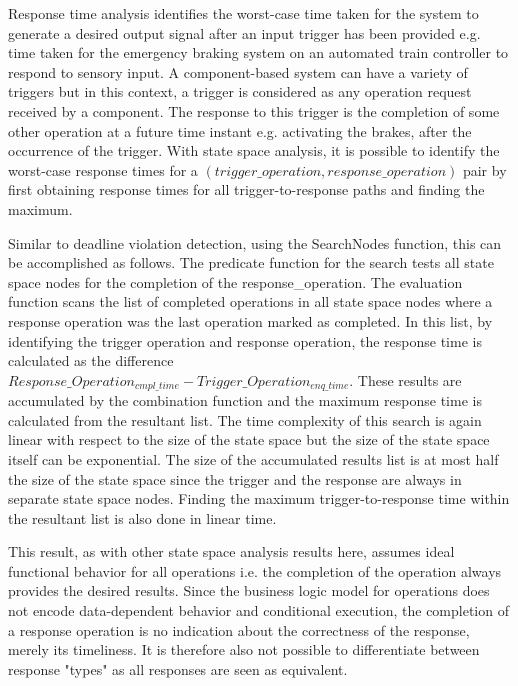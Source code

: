 Response time analysis identifies the worst-case time taken for the system to generate a desired output signal after an input trigger has been provided e.g. time taken for the emergency braking system on an automated train controller to respond to sensory input. A component-based system can have a variety of triggers but in this context, a trigger is considered as any operation request received by a component. The response to this trigger is the completion of some other operation at a future time instant e.g. activating the brakes, after the occurrence of the trigger. With state space analysis, it is possible to identify the worst-case response times for a $(trigger\_operation, response\_operation)$ pair by first obtaining response times for all trigger-to-response paths and finding the maximum. 

Similar to deadline violation detection, using the SearchNodes function, this can be accomplished as follows. The predicate function for the search tests all state space nodes for the completion of the response\_operation. The evaluation function scans the list of completed operations in all state space nodes where a response operation was the last operation marked as completed. In this list, by identifying the trigger operation and response operation, the response time is calculated as the difference $Response\_Operation_{cmpl\_time} - Trigger\_Operation_{enq\_time}$. These results are accumulated by the combination function and the maximum response time is calculated from the resultant list. The time complexity of this search is again linear with respect to the size of the state space but the size of the state space itself can be exponential. The size of the accumulated results list is at most half the size of the state space since the trigger and the response are always in separate state space nodes. Finding the maximum trigger-to-response time within the resultant list is also done in linear time.   

This result, as with other state space analysis results here, assumes ideal functional behavior for all operations i.e. the completion of the operation always provides the desired results. Since the business logic model for operations does not encode data-dependent behavior and conditional execution, the completion of a response operation is no indication about the correctness of the response, merely its timeliness. It is therefore also not possible to differentiate between response "types" as all responses are seen as equivalent. 


